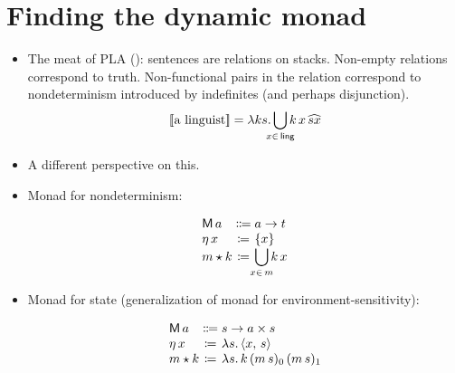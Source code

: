 \section{Finding the dynamic monad}
\begin{itemize}
	\item The meat of PLA (\citealt{Dekker:1994}): sentences are relations on stacks. Non-empty relations correspond to truth. Non-functional pairs in the relation correspond to nondeterminism introduced by indefinites (and perhaps disjunction).%
	\[\sv{\text{a linguist}} = \lambda ks.\bigcup_{\mathclap{x\in\,\textsf{ling}}}k\,x\,\widehat{sx}\]%

	\item A different perspective on this. 
	
	\item Monad for nondeterminism:
	\begin{defi}\label{set}
		\[\begin{array}[t]
			{@{}l@{}c@{}l@{}}
			\textsf{M}\,a &{}\Coloneqq{} &a \ra t%
			\\
			\eta\,x &{}\ceq{} &\{x\}
			\\
			m \star k &{}\ceq{} &\displaystyle\bigcup_{\mathclap{x\in \,m}}k\,x%
		\end{array}\]
	\end{defi}
	
	\item Monad for state (generalization of monad for environment-sensitivity):
	\begin{defi}\label{state}
		\[\begin{array}[t]
			{@{}l@{}c@{}l@{}}
			\textsf{M}\,a &{}\Coloneqq{} &s \ra a \times s%
			\\
			\eta\,x &{}\ceq{} &\lambda s .\,\ab{x,\,s}
			\\
			m \star k &{}\ceq{} &\lambda s.\,k\,(m\,s)_0\,(m\,s)_1%
		\end{array}\]
	\end{defi}
	

\end{itemize}
